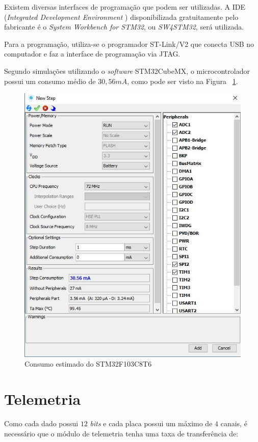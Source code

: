 \documentclass[11pt]{abntex2}
\begin{document}
				Existem diversas interfaces de programação que podem ser
				utilizadas. A IDE (\textit{Integrated Development Environment })
				disponibilizada gratuitamente pelo fabricante é o \textit{System
				Workbench for STM32}, ou \textit{SW4STM32}, será utilizada.

				Para a programação, utiliza-se o programador ST-Link/V2 que
				conecta USB no computador e faz a interface de programação via
				JTAG.

				Segundo simulações utilizando o \textit{software} STM32CubeMX, o
				microcontrolador possui um consumo médio de $30,56mA$, como pode ser
				visto na Figura ~\ref{fig:consumoSTM}.

				\begin{figure}[!ht]
					\centering
					\includegraphics[scale = 0.6]{../../Fotos/stmConsumo.jpg}
					\caption{Consumo estimado do STM32F103C8T6}
					\label{fig:consumoSTM}
				\end{figure}

			\section{Telemetria}
				Como cada dado possui $12$ \textit{bits} e cada placa possui um
				máximo de $4$ canais, é necessário que o módulo de telemetria
				tenha uma taxa de transferência de:
\end{document}

